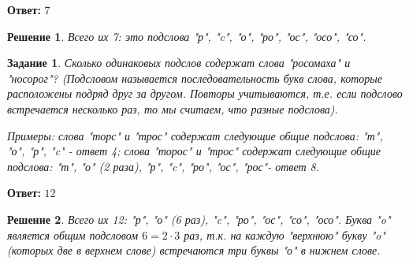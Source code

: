 \documentclass[a4paper,oneside]{memoir}
\newtheorem{task}{Задание}
\newtheorem{solution}{Решение}
\begin{document}
\textbf{Ответ:} $ 7 $

\begin{solution}
	Всего их 7: это подслова "р", "c", "о", "ро", "ос", "осо", "со".
\end{solution}

\hrulefill

\begin{task}
	Сколько одинаковых подслов содержат слова "росомаха" и "носорог"? (Подсловом называется последовательность букв слова, которые расположены подряд друг за другом. Повторы учитываются, т.е. если подслово встречается несколько раз, то мы считаем, что разные подслова).
	
	Примеры: слова "торс" и "трос" содержат следующие общие подслова: "т", "о", "р", "c" - ответ 4; слова "торос" и "трос" содержат следующие общие подслова: "т", "о" (2 раза), "р", "c", "ро", "ос", "рос"- ответ 8.
	
\end{task}

\textbf{Ответ:} $ 12 $

\begin{solution}
	Всего их 12: "р", "о" (6 раз), "c", "ро", "ос", "со", "осо". Буква "o" является общим подсловом $ 6=2\cdot 3 $ раз, т.к. на каждую "верхнюю" букву "o" (которых две в верхнем слове) встречаются три буквы "о" в нижнем слове.
\end{solution}
\end{document}
